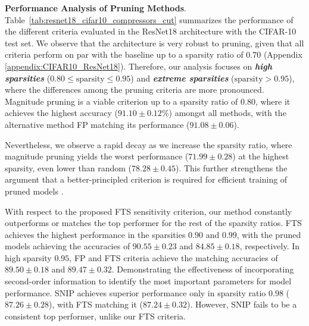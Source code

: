 
\textbf{Performance Analysis of Pruning Methods}. Table~\ref{tab:resnet18_cifar10_compressors_cut} summarizes the performance of the different criteria evaluated in the ResNet18 architecture with the CIFAR-10 test set. We observe that the architecture is very robust to pruning, given that all criteria perform on par with the baseline up to a sparsity ratio of $0.70$ (Appendix \ref{appendix:CIFAR10_ResNet18}). Therefore, our analysis focuses on \textbf{\textit{high sparsities}} (\(0.80 \leq \text{sparsity} \leq 0.95\)) and \textbf{\textit{extreme sparsities}} (\(\text{sparsity} > 0.95\)), where the differences among the pruning criteria are more pronounced. Magnitude pruning is a viable criterion up to a sparsity ratio of $0.80$, where it achieves the highest accuracy (\(91.10 \pm 0.12\%\)) amongst all methods, with the alternative method FP matching its performance ($91.08 \pm 0.06$). 

Nevertheless, we observe a rapid decay as we increase the sparsity ratio, where magnitude pruning yields the worst performance ($71.99 \pm 0.28$) at the highest sparsity, even lower than random ($78.28 \pm 0.45$). This further strengthens the argument that a better-principled criterion is required for efficient training of pruned models \cite{lecun1989optimal}. 

With respect to the proposed FTS sensitivity criterion, our method constantly outperforms or matches the top performer for the rest of the sparsity ratios. FTS achieves the highest performance in the sparsities $0.90$ and $0.99$, with the pruned models achieving the accuracies of $90.55 \pm 0.23$ and $84.85 \pm 0.18$, respectively. In high sparsity $0.95$, FP and FTS criteria achieve the matching accuracies of $89.50 \pm 0.18$ and $89.47 \pm 0.32$. Demonstrating the effectiveness of incorporating second-order information to identify the most important parameters for model performance. SNIP achieves superior performance only in sparsity ratio $0.98$ ($87.26 \pm 0.28$), with FTS matching it ($87.24 \pm 0.32$). However, SNIP fails to be a consistent top performer, unlike our FTS criteria.

